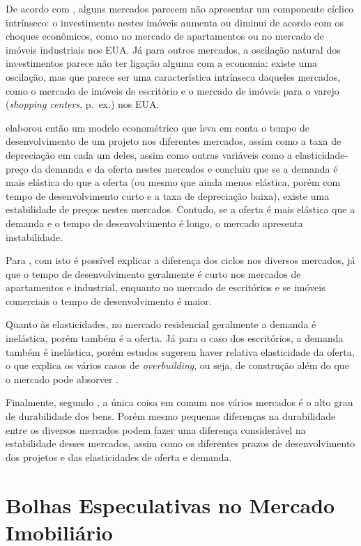 \documentclass[
	12pt,				%
	oneside,			%
	a4paper,			%
	chapter=TITLE,		%
	section=TITLE,		%
	english,			%
	brazil				%
	]{abntex2}
\begin{document}
De acordo com \textcite[p.~212]{wheaton1999}, alguns mercados parecem não apresentar um
componente cíclico intrínseco: o investimento nestes imóveis aumenta ou diminui
de acordo com os choques econômicos, como no mercado de apartamentos ou no
mercado de imóveis industriais nos EUA. Já para outros mercados, a oscilação
natural dos investimentos parece não ter ligação alguma com a economia: existe
uma oscilação, mas que parece ser uma característica intrínseca daqueles
mercados, como o mercado de imóveis de escritório e o mercado de imóveis para o
varejo (\emph{shopping centers}, p.~ex.) nos EUA.

\textcite{wheaton1999} elaborou então um modelo econométrico que leva em conta o tempo de
desenvolvimento de um projeto nos diferentes mercados, assim como a taxa de
depreciação em cada um deles, assim como outras variáveis como a
elasticidade-preço da demanda e da oferta nestes mercados e concluiu que se a
demanda é mais elástica do que a oferta (ou mesmo que ainda menos elástica,
porém com tempo de desenvolvimento curto e a taxa de depreciação baixa),
existe uma estabilidade de preços nestes mercados. Contudo, se a oferta é mais
elástica que a demanda e o tempo de desenvolvimento é longo, o mercado
apresenta instabilidade.

Para \textcite[p.~228]{wheaton1999}, com isto é possível explicar a diferença dos ciclos
nos diversos mercados, já que o tempo de desenvolvimento geralmente é curto nos
mercados de apartamentos e industrial, enquanto no mercado de escritórios e se
imóveis comerciais o tempo de desenvolvimento é maior.

Quanto às elasticidades, no mercado residencial geralmente a demanda é
inelástica, porém também é a oferta. Já para o caso dos escritórios, a demanda
também é inelástica, porém estudos sugerem haver relativa elasticidade da oferta,
o que explica os vários casos de \emph{overbuilding}, ou seja, de construção além do
que o mercado pode absorver \autocite[p.~228]{wheaton1999}.

Finalmente, segundo \textcite[p.~228]{wheaton1999}, a única coisa em comum nos vários
mercados é o alto grau de durabilidade dos bens. Porém mesmo pequenas diferenças
na durabilidade entre os diversos mercados podem fazer uma diferença
considerável na estabilidade desses mercados, assim como os diferentes prazos de
desenvolvimento dos projetos e das elasticidades de oferta e demanda.

\hypertarget{bolhas-especulativas-no-mercado-imobiliuxe1rio}{%
\section{Bolhas Especulativas no Mercado Imobiliário}\label{bolhas-especulativas-no-mercado-imobiliuxe1rio}}
\end{document}
